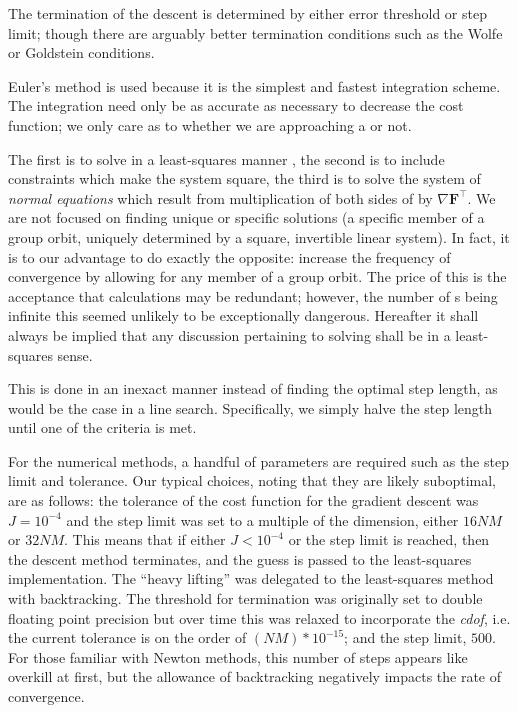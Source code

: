\begin{description}
{The termination of the descent is determined by either error threshold
or step limit; though there are arguably better termination conditions such as the Wolfe or
Goldstein conditions.


Euler's
method is used because it is the simplest and fastest integration scheme.
The integration need only be as accurate as necessary to decrease the cost function;
we only care as to whether we are approaching a {\po} or not.


The first is to solve  in a least-squares manner ,
the second is to include constraints which make the system square, the third is to solve
the system of \textit{normal equations} which result from multiplication of both sides of
 by $\nabla\mathbf{F}^{\top}$.
We are not focused on finding unique or specific solutions (a specific member of a group
orbit, uniquely determined by a square, invertible linear system).
In fact, it is to our advantage to do exactly the opposite: increase the frequency of convergence
by allowing for any member of a group orbit.
The price of this is the acceptance that calculations may be redundant; however,
the number of {\po}s being infinite this seemed unlikely to be exceptionally
dangerous. Hereafter it shall always
be implied that any discussion pertaining to solving  shall be in a least-squares
sense.

 This is
done in an inexact manner instead of finding the optimal step length, as
would be the case in a line search. Specifically, we simply halve the step length
until one of the criteria is met.

For the numerical methods, a handful of parameters are required such as the step limit
and tolerance. Our typical choices, noting that they are likely suboptimal, are as follows:
the tolerance of the cost function for the gradient descent was $J = 10^{-4}$
and the step limit was set to a multiple of the dimension, either $16NM$ or $32NM$.
This means that if either  $J < 10^{-4}$ or the step limit
is reached, then the descent method terminates, and the guess is passed to the
least-squares implementation.
The ``heavy lifting'' was delegated to the least-squares method
with backtracking. The threshold for termination was originally set to double
floating point precision but over time this was relaxed to incorporate the {\em cdof}, i.e.
the current tolerance is on the order of $(NM)*10^{-15}$; and the step limit, $500$.
For those familiar with Newton methods, this number of steps appears like overkill at first, but the
allowance of backtracking negatively impacts the rate of convergence.

}
\end{description}
